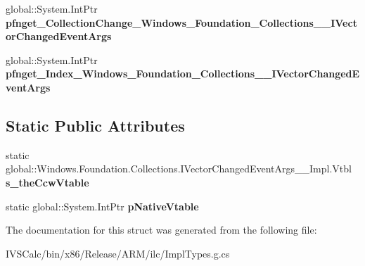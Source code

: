 \begin{DoxyCompactItemize}
\item 
\mbox{\label{struct_windows_1_1_foundation_1_1_collections_1_1_i_vector_changed_event_args_____impl_1_1_vtbl_a1def285696140e7286354a05dadf4cb9}} 
global\+::\+System.\+Int\+Ptr {\bfseries pfnget\+\_\+\+Collection\+Change\+\_\+\+Windows\+\_\+\+Foundation\+\_\+\+Collections\+\_\+\+\_\+\+I\+Vector\+Changed\+Event\+Args}
\item 
\mbox{\label{struct_windows_1_1_foundation_1_1_collections_1_1_i_vector_changed_event_args_____impl_1_1_vtbl_a70d7b88c20903a8b68f6364a52795c24}} 
global\+::\+System.\+Int\+Ptr {\bfseries pfnget\+\_\+\+Index\+\_\+\+Windows\+\_\+\+Foundation\+\_\+\+Collections\+\_\+\+\_\+\+I\+Vector\+Changed\+Event\+Args}
\end{DoxyCompactItemize}
\subsection*{Static Public Attributes}
\begin{DoxyCompactItemize}
\item 
\mbox{\label{struct_windows_1_1_foundation_1_1_collections_1_1_i_vector_changed_event_args_____impl_1_1_vtbl_ad27f1f5abfc1fd1af13d63c201a153ec}} 
static global\+::\+Windows.\+Foundation.\+Collections.\+I\+Vector\+Changed\+Event\+Args\+\_\+\+\_\+\+Impl.\+Vtbl {\bfseries s\+\_\+the\+Ccw\+Vtable}
\item 
\mbox{\label{struct_windows_1_1_foundation_1_1_collections_1_1_i_vector_changed_event_args_____impl_1_1_vtbl_a5722a4b9f1b04b10fe37f398e8e4d9ba}} 
static global\+::\+System.\+Int\+Ptr {\bfseries p\+Native\+Vtable}
\end{DoxyCompactItemize}


The documentation for this struct was generated from the following file\+:\begin{DoxyCompactItemize}
\item 
I\+V\+S\+Calc/bin/x86/\+Release/\+A\+R\+M/ilc/Impl\+Types.\+g.\+cs\end{DoxyCompactItemize}
